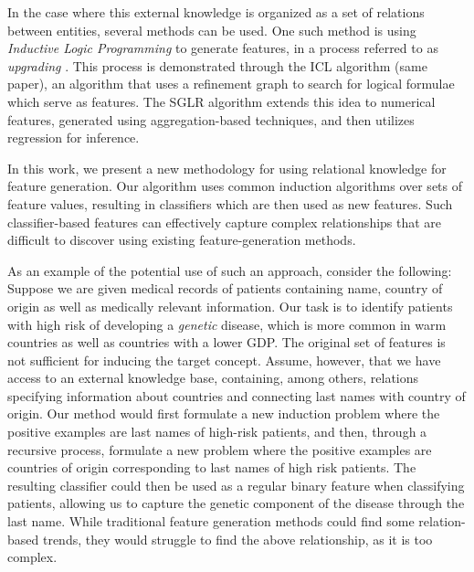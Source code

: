 \documentclass[12pt, a4paper]{article}
\theoremstyle{definition}
\begin{document}
In the case where this external knowledge is organized as a set of relations between entities, several methods can be used. One such method is using \emph{Inductive Logic Programming} \citep{muggleton1991inductive} to generate features, in a process referred to as \emph{upgrading} \citep{van2001upgrade}. This process is demonstrated through the ICL algorithm (same paper), an algorithm that uses a refinement graph to search for logical formulae which serve as features. The SGLR algorithm \citep{popescul200716} extends this idea to numerical features, generated using aggregation-based techniques, and then utilizes regression for inference.

In this work, we present a new methodology for using relational knowledge for feature generation.  Our algorithm uses common induction algorithms over sets of feature values, resulting in classifiers which are then used as new features.
Such classifier-based features can effectively capture complex relationships that are difficult to discover using existing feature-generation methods.

As an example of the potential use of such an approach, consider the following:
Suppose we are given medical records of patients containing name, country of origin as well as medically relevant information.
Our task is to identify patients with high risk of developing a \emph{genetic} disease, which is more common in warm countries as well as countries with a lower GDP.
The original set of features is not sufficient for inducing the target concept.  Assume, however, that we have access to an external knowledge base, containing, among others, relations specifying information about countries and connecting last names with country of origin.
Our method would first formulate a new induction problem where the positive examples are last names of high-risk patients, and then, through a recursive process, formulate a new problem where the positive examples are countries of origin corresponding to last names of high risk patients. The resulting classifier could then be used as a regular binary feature when classifying patients, allowing us to capture the genetic component of the disease through the last name. While traditional feature generation methods could find some relation-based trends, they would struggle to find the above relationship, as it is too complex.
\end{document}
